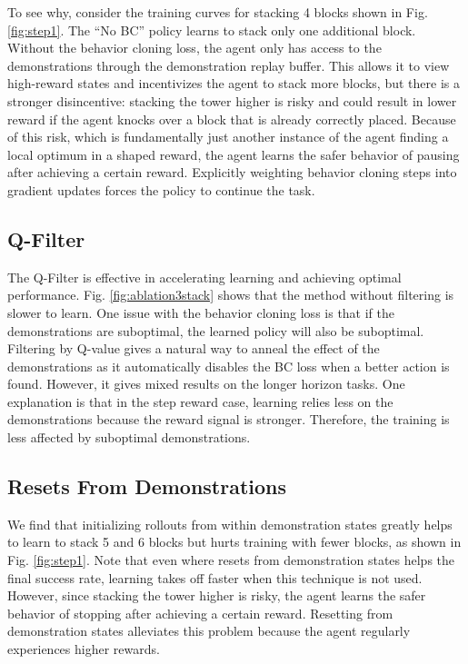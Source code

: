 \documentclass[letterpaper, 10 pt, conference]{ieeeconf}  %
\begin{document}
To see why, consider the training curves for stacking 4 blocks shown in Fig. \ref{fig:step1}. The ``No BC'' policy learns to stack only one additional block. Without the behavior cloning loss, the agent only has access to the demonstrations through the demonstration replay buffer. This allows it to view high-reward states and incentivizes the agent to stack more blocks, but there is a stronger disincentive: stacking the tower higher is risky and could result in lower reward if the agent knocks over a block that is already correctly placed. Because of this risk, which is fundamentally just another instance of the agent finding a local optimum in a shaped reward, the agent learns the safer behavior of pausing after achieving a certain reward. Explicitly weighting behavior cloning steps into gradient updates forces the policy to continue the task.

\subsection{Q-Filter} 

The Q-Filter is effective in accelerating learning and achieving optimal performance. Fig. \ref{fig:ablation3stack} shows that the method without filtering is slower to learn. One issue with the behavior cloning loss is that if the demonstrations are suboptimal, the learned policy will also be suboptimal. Filtering by Q-value gives a natural way to anneal the effect of the demonstrations as it automatically disables the BC loss when a better action is found. However, it gives mixed results on the longer horizon tasks. One explanation is that in the step reward case, learning relies less on the demonstrations because the reward signal is stronger. Therefore, the training is less affected by suboptimal demonstrations.

\subsection{Resets From Demonstrations}

We find that initializing rollouts from within demonstration states greatly helps to learn to stack 5 and 6 blocks but hurts training with fewer blocks, as shown in Fig. \ref{fig:step1}. Note that even where resets from demonstration states helps the final success rate, learning takes off faster when this technique is not used. However, since stacking the tower higher is risky, the agent learns the safer behavior of stopping after achieving a certain reward. Resetting from demonstration states alleviates this problem because the agent regularly experiences higher rewards.
\end{document}
